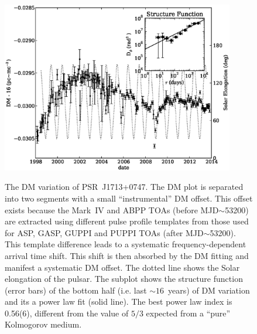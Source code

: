 \documentclass[12pt,preprint]{aastex}
\begin{document}
\begin{figure}
\includegraphics[width=4in]{DMX.ps} \\ 
\caption {\label{fig:dmx} The DM variation of PSR~J1713+0747. The DM plot is
separated into two segments with a small ``instrumental'' DM offset. This offset exists 
because the Mark~IV and ABPP TOAs (before MJD$\sim$53200) are extracted using
different pulse
profile templates from those used for ASP, GASP, GUPPI and PUPPI TOAs (after
MJD$\sim$53200). This template difference leads to a systematic
frequency-dependent arrival time shift. This shift is then absorbed by the DM
fitting and manifest a systematic DM offset. The dotted line shows the Solar
elongation of the pulsar. The subplot shows the structure
function (error bars) of the bottom half (i.e. last $\sim 16$~years) of DM
variation and its a power law fit (solid line). The best power law index is
0.56(6), different from the value of $5/3$ expected from a
``pure'' Kolmogorov medium. } 
\end{figure} 

\end{document}
